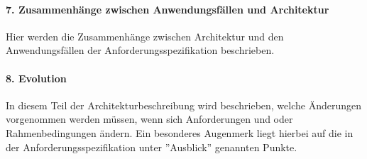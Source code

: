 \paragraph{7. Zusammenhänge zwischen Anwendungsfällen und Architektur}
Hier werden die Zusammenhänge zwischen Architektur und den Anwendungsfällen
der Anforderungsspezifikation beschrieben.
\paragraph{8. Evolution}
In diesem Teil der Architekturbeschreibung wird beschrieben, welche Änderungen
vorgenommen werden müssen, wenn sich Anforderungen und oder Rahmenbedingungen
ändern. Ein besonderes Augenmerk liegt hierbei auf die in der Anforderungsspezifikation unter ''Ausblick'' genannten Punkte.